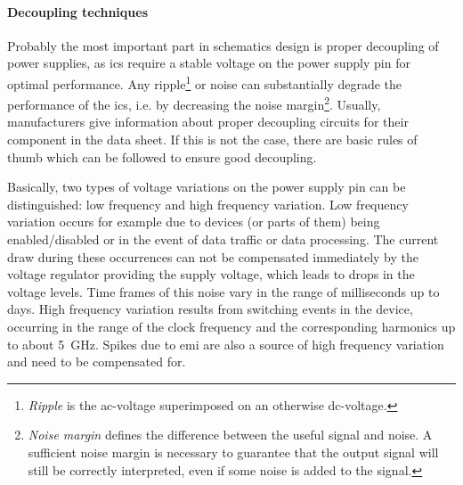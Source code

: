 \paragraph{Decoupling techniques}
Probably the most important part in schematics design is proper decoupling of power supplies, as \glspl{ic} require a stable voltage on the power supply pin for optimal performance.
Any ripple\footnote{\textit{Ripple} is the \gls{ac}-voltage superimposed on an otherwise \gls{dc}-voltage.} or noise can substantially degrade the performance of the \glspl{ic}, i.e. by decreasing the noise margin\footnote{\textit{Noise margin} defines the difference between the useful signal and noise. A sufficient noise margin is necessary to guarantee that the output signal will still be correctly interpreted, even if some noise is added to the signal.}.%
Usually, manufacturers give information about proper decoupling circuits for their component in the data sheet.
If this is not the case, there are basic rules of thumb which can be followed to ensure good decoupling. \cite{decouple}

Basically, two types of voltage variations on the power supply pin can be distinguished: low frequency and high frequency variation.
Low frequency variation occurs for example due to devices (or parts of them) being enabled/disabled or in the event of data traffic or data processing.
The current draw during these occurrences can not be compensated immediately by the voltage regulator providing the supply voltage, which leads to drops in the voltage levels.
Time frames of this noise vary in the range of milliseconds up to days.
High frequency variation results from switching events in the device, occurring in the range of the clock frequency and the corresponding harmonics up to about \SI{5}{\giga \hertz}.
Spikes due to \gls{emi} are also a source of high frequency variation and need to be compensated for. \cite{xilDecouple} 

